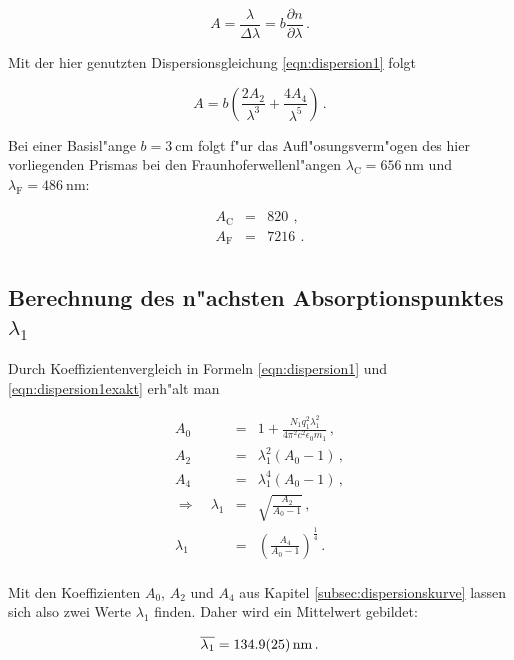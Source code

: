 		\begin{equation*}
			A = \frac{\lambda}{\Delta \lambda} = b \frac{\partial n}{\partial \lambda} \,.
		\end{equation*}

		Mit der hier genutzten Dispersionsgleichung \eqref{eqn:dispersion1} folgt

		\begin{equation*}
			A = b \left( \frac{2A_2}{\lambda^3} + \frac{4A_4}{\lambda^5} \right) \,.
		\end{equation*}

		Bei einer Basisl"ange $b = \SI{3}{\centi \meter}$ folgt f"ur das Aufl"osungsverm"ogen des hier vorliegenden Prismas bei den Fraunhoferwellenl"angen $\lambda_\mathrm{C} = \SI{656}{\nano \meter}$ und $\lambda_\mathrm{F} = \SI{486}{\nano \meter}$:

		\begin{eqnarray*}
			A_\mathrm{C} & = & \SI{820}{} \,, \\
			A_\mathrm{F} & = & \SI{7216}{} \,. \\
		\end{eqnarray*}

	\subsection{Berechnung des n"achsten Absorptionspunktes $\lambda_\mathrm{1}$}
	\label{subsec:absorptionspunkt}
		Durch Koeffizientenvergleich in Formeln \eqref{eqn:dispersion1} und \eqref{eqn:dispersion1exakt} erh"alt man

		\begin{eqnarray*}
			A_0 & = & 1 + \frac{N_1 q_1^2 \lambda_1^2}{4 \pi^2 c^2 \epsilon_0 m_1} \,, \\
			A_2 & = & \lambda_1^2 (A_0 - 1) \,, \\
			A_4 & = & \lambda_1^4 (A_0 - 1) \,, \\
			\Rightarrow \quad \lambda_1 & = & \sqrt{\frac{A_2}{A_0 - 1}} \,, \\
			\lambda_1 & = & \left(\frac{A_4}{A_0 - 1}\right)^\frac{1}{4} \,. \\
		\end{eqnarray*}

		Mit den Koeffizienten $A_0$, $A_2$ und $A_4$ aus Kapitel \ref{subsec:dispersionskurve} lassen sich also zwei Werte $\lambda_1$ finden.
		Daher wird ein Mittelwert gebildet:

		\begin{equation*}
			\overline{\lambda_1} = \SI{134.9 (25)}{\nano \meter} \,.
		\end{equation*}
